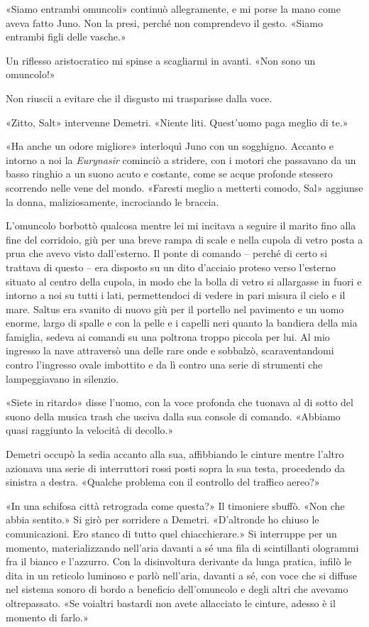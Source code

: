 «Siamo entrambi omuncoli» continuò allegramente, e mi porse la mano come
aveva fatto Juno. Non la presi, perché non comprendevo il gesto. «Siamo
entrambi figli delle vasche.»

Un riflesso aristocratico mi spinse a scagliarmi in avanti. «Non sono un
omuncolo!»

Non riuscii a evitare che il disgusto mi trasparisse dalla voce.

«Zitto, Salt» intervenne Demetri. «Niente liti. Quest'uomo paga meglio
di te.»

«Ha anche un odore migliore» interloquì Juno con un sogghigno. Accanto e
intorno a noi la \emph{Eurynasir} cominciò a stridere, con i motori che
passavano da un basso ringhio a un suono acuto e costante, come se acque
profonde stessero scorrendo nelle vene del mondo. «Faresti meglio a
metterti comodo, Sal» aggiunse la donna, maliziosamente, incrociando le
braccia.

L'omuncolo borbottò qualcosa mentre lei mi incitava a seguire il marito
fino alla fine del corridoio, giù per una breve rampa di scale e nella
cupola di vetro posta a prua che avevo visto dall'esterno. Il ponte di
comando -- perché di certo si trattava di questo -- era disposto su un
dito d'acciaio proteso verso l'esterno situato al centro della cupola,
in modo che la bolla di vetro si allargasse in fuori e intorno a noi su
tutti i lati, permettendoci di vedere in pari misura il cielo e il mare.
Saltus era svanito di nuovo giù per il portello nel pavimento e un uomo
enorme, largo di spalle e con la pelle e i capelli neri quanto la
bandiera della mia famiglia, sedeva ai comandi su una poltrona troppo
piccola per lui. Al mio ingresso la nave attraversò una delle rare onde
e sobbalzò, scaraventandomi contro l'ingresso ovale imbottito e da lì
contro una serie di strumenti che lampeggiavano in silenzio.

«Siete in ritardo» disse l'uomo, con la voce profonda che tuonava al di
sotto del suono della musica trash che usciva dalla sua console di
comando. «Abbiamo quasi raggiunto la velocità di decollo.»

Demetri occupò la sedia accanto alla sua, affibbiando le cinture mentre
l'altro azionava una serie di interruttori rossi posti sopra la sua
testa, procedendo da sinistra a destra. «Qualche problema con il
controllo del traffico aereo?»

«In una schifosa città retrograda come questa?» Il timoniere sbuffò.
«Non che abbia sentito.» Si girò per sorridere a Demetri. «D'altronde ho
chiuso le comunicazioni. Ero stanco di tutto quel chiacchierare.» Si
interruppe per un momento, materializzando nell'aria davanti a sé una
fila di scintillanti ologrammi fra il bianco e l'azzurro. Con la
disinvoltura derivante da lunga pratica, infilò le dita in un reticolo
luminoso e parlò nell'aria, davanti a sé, con voce che si diffuse nel
sistema sonoro di bordo a beneficio dell'omuncolo e degli altri che
avevamo oltrepassato. «Se voialtri bastardi non avete allacciato le
cinture, adesso è il momento di farlo.»

